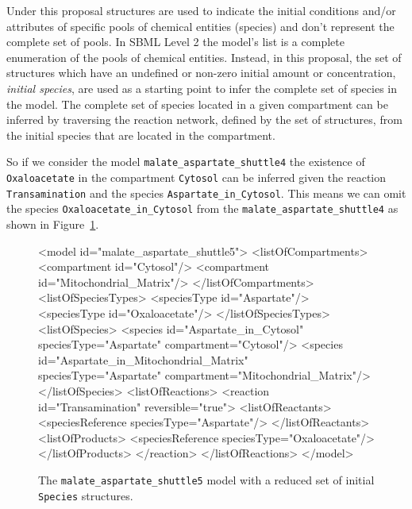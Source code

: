 \documentclass{cekarticle}
\begin{document}
Under this proposal  structures are used to indicate the initial conditions
and/or attributes of specific pools of chemical entities (species) and don't represent the complete
set of pools.  In SBML Level 2 the model's  list is a complete enumeration of the
pools of chemical entities.  Instead, in this proposal, the set of  structures
which have an undefined or non-zero initial amount or concentration, \emph{initial species}, are used 
as a starting point to infer the complete set of species in the model.  The complete set of species
located in a given compartment can be inferred by traversing the reaction
network, defined by the set of  structures, from the initial species that are located
in the compartment.

So if we consider the model \texttt{malate\_aspartate\_shuttle4} the existence of
\texttt{Oxaloacetate} in the compartment \texttt{Cytosol} can be inferred given the reaction
\texttt{Transamination} and the species \texttt{Aspartate\_in\_Cytosol}.  This means we can omit
the species \texttt{Oxaloacetate\_in\_Cytosol} from the \texttt{malate\_aspartate\_shuttle4} as shown
in Figure~\ref{fig:malate_aspartate_shuttle5-xml}.

\begin{figure}[h]
\begin{example}
<model id="malate_aspartate_shuttle5">
    <listOfCompartments>
        <compartment id="Cytosol"/>
        <compartment id="Mitochondrial_Matrix"/>
    </listOfCompartments>
    <listOfSpeciesTypes>
        <speciesType id="Aspartate"/>
        <speciesType id="Oxaloacetate"/>
    </listOfSpeciesTypes>
    <listOfSpecies>
        <species
            id="Aspartate_in_Cytosol"
            speciesType="Aspartate"
            compartment="Cytosol"/>
        <species
            id="Aspartate_in_Mitochondrial_Matrix"
            speciesType="Aspartate"
            compartment="Mitochondrial_Matrix"/>
    </listOfSpecies>
    <listOfReactions>
        <reaction id="Transamination" reversible="true">
            <listOfReactants>
                <speciesReference speciesType="Aspartate"/>
            </listOfReactants>
            <listOfProducts>
                <speciesReference speciesType="Oxaloacetate"/>
            </listOfProducts>
        </reaction>
    </listOfReactions>
</model>
\end{example}
\caption{The \texttt{malate\_aspartate\_shuttle5} model with a reduced set of initial \texttt{Species}
structures.} 
\label{fig:malate_aspartate_shuttle5-xml}
\end{figure}
\end{document}

